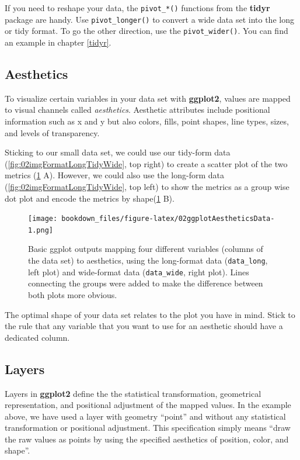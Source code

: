 \documentclass[
]{krantz}
\begin{document}
If you need to reshape your data, the \texttt{pivot\_*()} functions from the \textbf{tidyr} package are handy. Use \texttt{pivot\_longer()} to convert a wide data set into the long or tidy format. To go the other direction, use the \texttt{pivot\_wider()}. You can find an example in chapter \ref{tidyr}.

\hypertarget{aesthetics}{%
\subsection{Aesthetics}\label{aesthetics}}

To visualize certain variables in your data set with \textbf{ggplot2}, values are mapped to visual channels called \emph{aesthetics}. Aesthetic attributes include positional information such as x and y but also colors, fills, point shapes, line types, sizes, and levels of transparency.

Sticking to our small data set, we could use our tidy-form data (\ref{fig:02imgFormatLongTidyWide}, top right) to create a scatter plot of the two metrics (\ref{fig:02ggplotAestheticsData} A). However, we could also use the long-form data (\ref{fig:02imgFormatLongTidyWide}, top left) to show the metrics as a group wise dot plot and encode the metrics by shape(\ref{fig:02ggplotAestheticsData} B).

\begin{figure}
\centering
\texttt{[image: bookdown\_files/figure-latex/02ggplotAestheticsData-1.png]}
\caption{\label{fig:02ggplotAestheticsData}Basic ggplot outputs mapping four different variables (columns of the data set) to aesthetics, using the long-format data (\texttt{data\_long}, left plot) and wide-format data (\texttt{data\_wide}, right plot). Lines connecting the groups were added to make the difference between both plots more obvious.}
\end{figure}

The optimal shape of your data set relates to the plot you have in mind. Stick to the rule that any variable that you want to use for an aesthetic should have a dedicated column.

\hypertarget{layers}{%
\subsection{Layers}\label{layers}}

Layers in \textbf{ggplot2} define the the statistical transformation, geometrical representation, and positional adjustment of the mapped values. In the example above, we have used a layer with geometry ``point'' and without any statistical transformation or positional adjustment. This specification simply means ``draw the raw values as points by using the specified aesthetics of position, color, and shape''.
\end{document}
